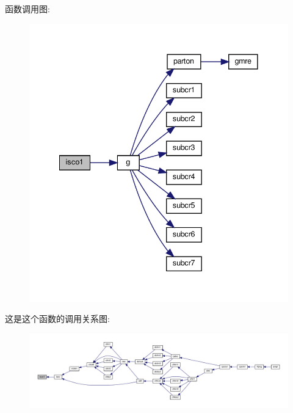 函数调用图\+:
\nopagebreak
\begin{figure}[H]
\begin{center}
\leavevmode
\includegraphics[width=341pt]{isco1_8f90_ae805535030ce5e9144a20555e68aea39_cgraph}
\end{center}
\end{figure}
这是这个函数的调用关系图\+:
\nopagebreak
\begin{figure}[H]
\begin{center}
\leavevmode
\includegraphics[width=350pt]{isco1_8f90_ae805535030ce5e9144a20555e68aea39_icgraph}
\end{center}
\end{figure}
